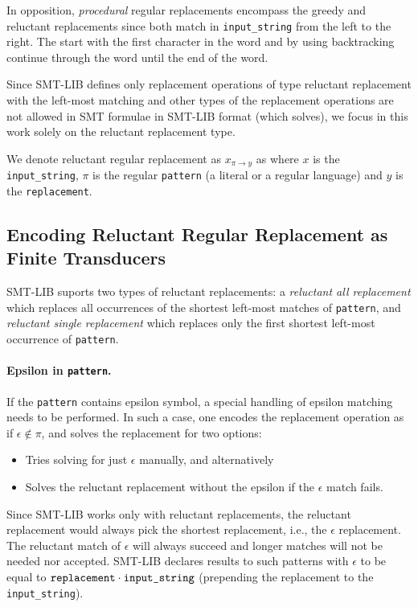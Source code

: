 In opposition, \emph{procedural} regular replacements encompass the greedy and reluctant replacements since both match in \texttt{input\_string} from the left to the right.
The start with the first character in the word and by using backtracking continue through the word until the end of the word.

Since SMT-LIB defines only replacement operations of type reluctant replacement with the left-most matching and other types of the replacement operations are not allowed in SMT formulae in SMT-LIB format (which \noodler solves), we focus in this work solely on the reluctant replacement type.

We denote reluctant regular replacement as $x_{\pi \rightarrow y}$ as where $x$ is the \texttt{input\_string}, $\pi$ is the regular \texttt{pattern} (a literal or a regular language) and $y$ is the \texttt{replacement}.

\subsection{Encoding Reluctant Regular Replacement as Finite Transducers}

SMT-LIB suports two types of reluctant replacements: a \emph{reluctant all replacement} which replaces all occurrences of the shortest left-most matches of \texttt{pattern}, and \emph{reluctant single replacement} which replaces only the first shortest left-most occurrence of \texttt{pattern}.

\paragraph{Epsilon in \texttt{pattern}.}
If the \texttt{pattern} contains epsilon symbol, a special handling of epsilon matching needs to be performed. In such a case, one encodes the replacement operation as if $\epsilon \notin \pi$, and solves the replacement for two options:
\begin{itemize}
  \item Tries solving for just $\epsilon$ manually, and alternatively
  \item Solves the reluctant replacement without the epsilon if the $\epsilon$ match fails.
\end{itemize}
Since SMT-LIB works only with reluctant replacements, the reluctant replacement would always pick the shortest replacement, i.e., the $\epsilon$ replacement. The reluctant match of $\epsilon$ will always succeed and longer matches will not be needed nor accepted. SMT-LIB declares results to such patterns with $\epsilon$ to be equal to $\texttt{replacement} \cdot \texttt{input\_string}$ (prepending the replacement to the \texttt{input\_string}).

